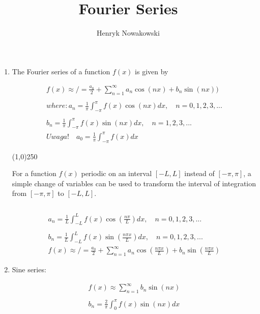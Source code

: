 \documentclass[11pt]{article}
\begin{document}
\author{Henryk Nowakowski}
\title{Fourier Series}
\maketitle




\begin{enumerate}

\item %

	The Fourier series of a function $f(x)$ is given by 


\begin{align*}
f(x) \approx / = \frac{a_{0}}{2}+\sum_{n=1}^{\infty} a_{n}\cos(nx) + b_{n}\sin(nx))\\ \\

where: 

a_{n}= \frac{1}{\pi}\int_{-\pi}^{\pi} f(x) \cos(nx) dx,\quad n=0,1,2,3,... \\
\\ b_{n}= \frac{1}{\pi}\int_{-\pi}^{\pi} f(x) \sin(nx) dx, \quad n=1,2,3,... \\
Uwaga! \quad a_{0} = \frac{1}{\pi} \int_{-\pi}^{\pi} f(x) dx
\end{align*}


\line(1,0){250}

 For a function $f(x)$ periodic on an interval $[-L,L]$ instead of  $[-\pi,\pi]$, a simple change of variables can be used to transform the interval of integration from $[-\pi,\pi]$ to $[-L,L]$.

\begin{align*}
\\  \\
a_{n}= \frac{1}{L}\int_{-L}^{L} f(x) \cos(\frac{n\pi}{L}) dx,\quad
n=0,1,2,3,... \\ \\ b_{n}= \frac{1}{L}\int_{-L}^{L} f(x) \sin(\frac{n\pi x}{L}) dx,\quad
n=0,1,2,3,... \\
f(x) \approx / = \frac{a_{0}}{2}+\sum_{n=1}^{\infty} a_{n}\cos(\frac{n \pi x}{L}) + b_{n}\sin(\frac{n \pi x}{L})
\end{align*}


\item %


	Sine series:

\begin{align*}
    f(x) \approx \sum_{n=1}^{\infty} b_{n} \sin(nx) \\ \\
    b_{n} = \frac{2}{\pi} \int_{0}^{\pi} f(x)\sin(nx) dx
\end{align*}


\end{enumerate}
\end{document}
